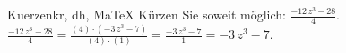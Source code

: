 \begin{MAufgabe}{Kuerzen}{kr, dh, MaTeX}
K\"urzen Sie soweit m\"oglich: $\frac{ - 12\, z^3 - 28}{4}$.\\ 
\ifLsg\MLoesung
\quad $\frac{ - 12\, z^3 - 28}{4}=\frac{(4)\cdot( - 3\, z^3 - 7)}{(4)\cdot(1)}=\frac{ - 3\, z^3 - 7}{1}= - 3\, z^3 - 7$.\else\relax\fi
 \end{MAufgabe}